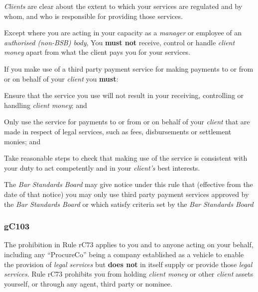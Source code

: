 \emph{Clients} are clear about the extent to which your services are
regulated and by whom, and who is responsible for providing those
services.




Except where you are acting in your capacity as a \emph{manager} or
employee of an \emph{authorised (non-BSB) body}, You \textcolor{myred}{\textbf{must not}} receive,
control or handle \emph{client money} apart from what the client pays
you for your services.


If you make use of a third party payment service for making payments to
or from or on behalf of your \emph{client} you \textcolor{myred}{\textbf{must}}:
\begin{numlist}
\item Ensure that the service you use will not result in your receiving,
controlling or handling \emph{client money}; and

\item Only use the service for payments to or from or on behalf of your
\emph{client} that are made in respect of legal services, such as fees,
disbursements or settlement monies; and

\item Take reasonable steps to check that making use of the service is
consistent with your duty to act competently and in your \emph{client's}
best interests.
\end{numlist}

The \emph{Bar Standards Board} may give notice under this rule that
(effective from the date of that notice) you may only use third party
payment services approved by the \emph{Bar Standards Board} or which
satisfy criteria set by the \emph{Bar Standards Board}




\subsubsection{\color{darkgrey}gC103}

The prohibition in Rule rC73 applies to you and to anyone acting on your
behalf, including any ``ProcureCo'' being a company established as a
vehicle to enable the provision of \emph{legal services} but \textcolor{myred}{\textbf{does not}} in
itself supply or provide those \emph{legal services}. Rule rC73
prohibits you from holding \emph{client money} or other \emph{client}
assets yourself, or through any agent, third party or nominee.

